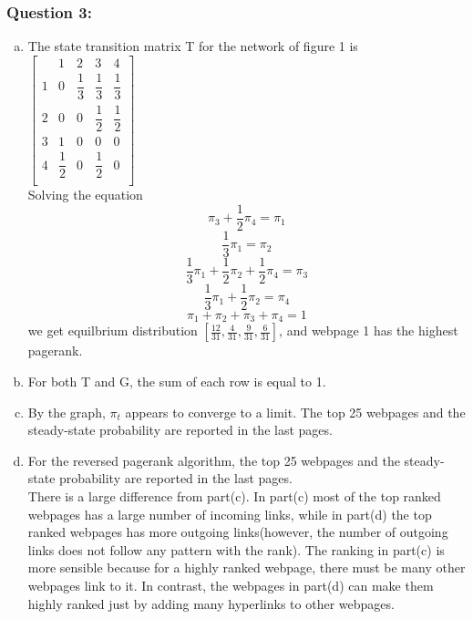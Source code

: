 \documentclass[12pt]{article}
\begin{document}
\subsubsection*{Question 3:} 
\begin{enumerate}[a)]
  \item 
  The state transition matrix T for the network of figure 1 is\\
  $
  \begin{bmatrix}
    & 1 & 2 & 3 & 4\\
  1 & 0 & \dfrac{1}{3} & \dfrac{1}{3} & \dfrac{1}{3}\\
  2 & 0 & 0 & \dfrac{1}{2} & \dfrac{1}{2}\\
  3 & 1 & 0 & 0 & 0\\
  4 & \dfrac{1}{2} & 0 & \dfrac{1}{2} & 0\\
  \end{bmatrix}
  $\\
  Solving the equation
  \begin{equation}
  \pi_3+\dfrac{1}{2}\pi_4=\pi_1
  \end{equation}  
  \begin{equation}
  \dfrac{1}{3}\pi_1=\pi_2
  \end{equation}  
  \begin{equation}
  \dfrac{1}{3}\pi_1+\dfrac{1}{2}\pi_2+\dfrac{1}{2}\pi_4=\pi_3
  \end{equation} 
  \begin{equation}
  \dfrac{1}{3}\pi_1+\dfrac{1}{2}\pi_2=\pi_4
  \end{equation}
  \begin{equation}
  \pi_1+\pi_2+\pi_3+\pi_4=1
  \end{equation} 
  we get equilbrium distribution $[\frac{12}{31},\frac{4}{31},\frac{9}{31},\frac{6}{31}]$, and webpage 1 has the highest pagerank.
  
  \item 
  For both T and G, the sum of each row is equal to 1.
  
  \item 
  By the graph, $\pi_t$ appears to converge to a limit. The top 25 webpages and the steady-state probability are reported in the last pages. 

  \item 
  For the reversed pagerank algorithm, the top 25 webpages and the steady-state probability are reported in the last pages. \\
  There is a large difference from part(c). In part(c) most of the top ranked webpages has a large number of incoming links, while in part(d) the top ranked webpages has more outgoing links(however, the number of outgoing links does not follow any pattern with the rank). The ranking in part(c) is more sensible because for a highly ranked webpage, there must be many other webpages link to it. In contrast, the webpages in part(d) can make them highly ranked just by adding many hyperlinks to other webpages. 

\end{enumerate}

  
  
\end{document}
